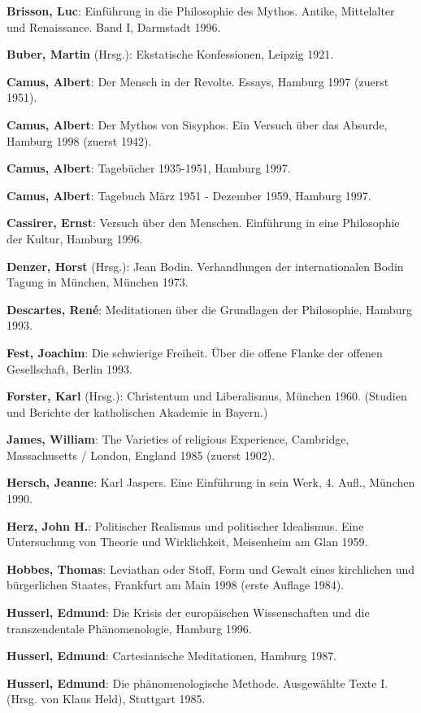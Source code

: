 {\bf Brisson, Luc}: Einführung in die Philosophie des Mythos. Antike,
Mittelalter und Renaissance. Band I, Darmstadt 1996.

{\bf Buber, Martin} (Hrsg.): Ekstatische Konfessionen, Leipzig 1921. 

{\bf Camus, Albert}: Der Mensch in der Revolte. Essays, Hamburg 1997 (zuerst
1951).

{\bf Camus, Albert}: Der Mythos von Sisyphos. Ein Versuch über das Absurde,
Hamburg 1998 (zuerst 1942).

{\bf Camus, Albert}: Tagebücher 1935-1951, Hamburg 1997.

{\bf Camus, Albert}: Tagebuch März 1951 - Dezember 1959, Hamburg 1997.

{\bf Cassirer, Ernst}: Versuch über den Menschen. Einführung in eine
Philosophie der Kultur, Hamburg 1996.

{\bf Denzer, Horst} (Hrsg.): Jean Bodin. Verhandlungen der internationalen
Bodin Tagung in München, München 1973.

{\bf Descartes, René}: Meditationen über die Grundlagen der Philosophie,
Hamburg 1993.

{\bf Fest, Joachim}: Die schwierige Freiheit. Über die offene Flanke der
offenen Gesellschaft, Berlin 1993.

{\bf Forster, Karl} (Hrsg.): Christentum und Liberalismus, München
1960. (Studien und Berichte der katholischen Akademie in Bayern.)

{\bf James, William}: The Varieties of religious Experience, Cambridge,
Massachusetts / London, England 1985 (zuerst 1902).

{\bf Hersch, Jeanne}: Karl Jaspers. Eine Einführung in sein Werk, 4. Aufl.,
München 1990.

{\bf Herz, John H.}: Politischer Realismus und politischer Idealismus.  Eine
Untersuchung von Theorie und Wirklichkeit, Meisenheim am Glan 1959.

{\bf Hobbes, Thomas}: Leviathan oder Stoff, Form und Gewalt eines kirchlichen
und bürgerlichen Staates, Frankfurt am Main 1998 (erste Auflage 1984).

{\bf Husserl, Edmund}: Die Krisis der europäischen Wissenschaften und die
transzendentale Phänomenologie, Hamburg 1996.

{\bf Husserl, Edmund}: Cartesianische Meditationen, Hamburg 1987.

{\bf Husserl, Edmund}: Die phänomenologische Methode. Ausgewählte Texte
I. (Hrsg. von Klaus Held), Stuttgart 1985.

